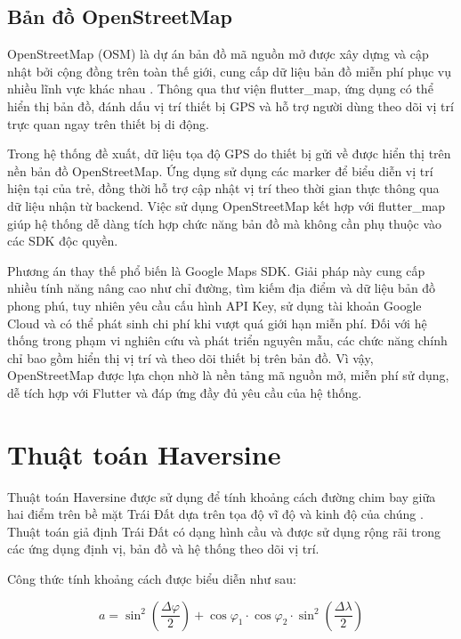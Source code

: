 \documentclass[../DoAn.tex]{subfiles}
\begin{document}
\subsection{Bản đồ OpenStreetMap}
\label{subsection:3.4.2}

OpenStreetMap (OSM) là dự án bản đồ mã nguồn mở được xây dựng và cập nhật bởi cộng đồng trên toàn thế giới, cung cấp dữ liệu bản đồ miễn phí phục vụ nhiều lĩnh vực khác nhau \cite{osm_wiki}. Thông qua thư viện flutter\_map, ứng dụng có thể hiển thị bản đồ, đánh dấu vị trí thiết bị GPS và hỗ trợ người dùng theo dõi vị trí trực quan ngay trên thiết bị di động.

Trong hệ thống đề xuất, dữ liệu tọa độ GPS do thiết bị gửi về được hiển thị trên nền bản đồ OpenStreetMap. Ứng dụng sử dụng các marker để biểu diễn vị trí hiện tại của trẻ, đồng thời hỗ trợ cập nhật vị trí theo thời gian thực thông qua dữ liệu nhận từ backend. Việc sử dụng OpenStreetMap kết hợp với flutter\_map giúp hệ thống dễ dàng tích hợp chức năng bản đồ mà không cần phụ thuộc vào các SDK độc quyền.

Phương án thay thế phổ biến là Google Maps SDK. Giải pháp này cung cấp nhiều tính năng nâng cao như chỉ đường, tìm kiếm địa điểm và dữ liệu bản đồ phong phú, tuy nhiên yêu cầu cấu hình API Key, sử dụng tài khoản Google Cloud và có thể phát sinh chi phí khi vượt quá giới hạn miễn phí. Đối với hệ thống trong phạm vi nghiên cứu và phát triển nguyên mẫu, các chức năng chính chỉ bao gồm hiển thị vị trí và theo dõi thiết bị trên bản đồ. Vì vậy, OpenStreetMap được lựa chọn nhờ là nền tảng mã nguồn mở, miễn phí sử dụng, dễ tích hợp với Flutter và đáp ứng đầy đủ yêu cầu của hệ thống.

\section{Thuật toán Haversine}
\label{section:3.5}

Thuật toán Haversine được sử dụng để tính khoảng cách đường chim bay giữa hai điểm trên bề mặt Trái Đất dựa trên tọa độ vĩ độ và kinh độ của chúng \cite{haversine_formula}. Thuật toán giả định Trái Đất có dạng hình cầu và được sử dụng rộng rãi trong các ứng dụng định vị, bản đồ và hệ thống theo dõi vị trí.

Công thức tính khoảng cách được biểu diễn như sau:

\begin{equation}
a = \sin^2\!\left(\frac{\Delta\varphi}{2}\right) + \cos\varphi_1 \cdot \cos\varphi_2 \cdot \sin^2\!\left(\frac{\Delta\lambda}{2}\right)
\label{eq:haversine_a}
\end{equation}
\end{document}
